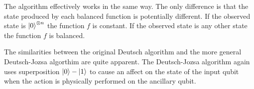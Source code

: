 % 

The algorithm effectively works in the same way.
The only difference is that the state produced by each balanced function is potentially different.
If the observed state is $\left\vert{0}\right\rangle^{\otimes{n}}$ the function $f$ is constant.
If the observed state is any other state the function $f$ is balanced.

The similarities between the original Deutsch algorithm and the more general Deutsch-Jozsa algorthim are quite apparent.
The Deutsch-Jozsa algorithm again uses superposition $\left\vert{0}\right\rangle-\left\vert{1}\right\rangle$ to cause an affect on the state of the input qubit when the action is physically performed on the ancillary qubit.

